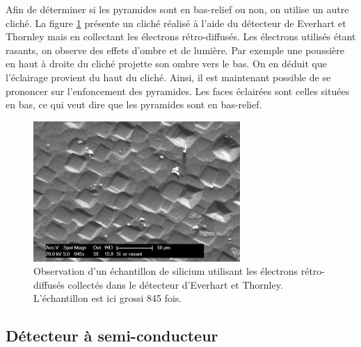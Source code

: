 \documentclass[a4paper,12pt]{article}
\newcommand\ett{Everhart et Thornley\xspace}
\begin{document}
Afin de déterminer si les pyramides sont en bas-relief ou non, on utilise un autre cliché. La figure \ref{fig:si_er_rasant} présente
un cliché réalisé à l'aide du détecteur de \ett mais en collectant les électrons rétro-diffusés. Les électrons utilisés étant rasants,
on observe des effets d'ombre et de lumière. Par exemple une poussière en haut à droite du cliché projette son ombre vers le bas.
On en déduit que l'éclairage provient du haut du cliché. Ainsi, il est maintenant possible de se prononcer sur l'enfoncement des pyramides.
Les faces éclairées sont celles situées en bas, ce qui veut dire que les pyramides sont en bas-relief.

\begin{figure}
\centering
\includegraphics[width=0.7\textwidth]{images/si_er_rasant.png}
\caption{Observation d'un échantillon de silicium utilisant les électrons rétro-diffusés collectés dans le détecteur d'\ett. L'échantillon est ici grossi 845 fois.}
\label{fig:si_er_rasant}
\end{figure}

\subsection{Détecteur à semi-conducteur}
\end{document}
